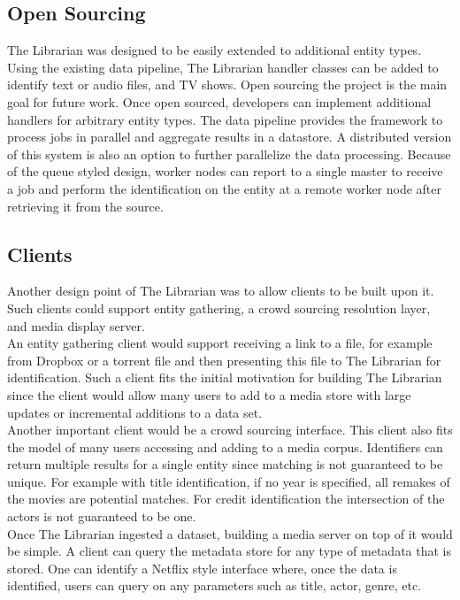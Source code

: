 \documentclass[paper=a4, fontsize=11pt]{scrartcl} %
\numberwithin{equation}{section} %
\numberwithin{figure}{section} %
\numberwithin{table}{section} %
\begin{document}
\subsection{Open Sourcing}
\label{sec:open-sourcing}
The Librarian was designed to be easily extended to additional entity types. Using the existing data pipeline, The Librarian handler classes can be added to identify text or audio files, and TV shows. Open sourcing the project is the main goal for future work. Once open sourced, developers can implement additional handlers for arbitrary entity types. The data pipeline provides the framework to process jobs in parallel and aggregate results in a datastore. A distributed version of this system is also an option to further parallelize the data processing. Because of the queue styled design, worker nodes can report to a single master to receive a job and perform the identification on the entity at a remote worker node after retrieving it from the source. \\

\subsection{Clients}
\label{sec:clients}
Another design point of The Librarian was to allow clients to be built upon it. Such clients could support entity gathering, a crowd sourcing resolution layer, and media display server. \\

An entity gathering client would support receiving a link to a file, for example from Dropbox or a torrent file and then presenting this file to The Librarian for identification. Such a client fits the initial motivation for building The Librarian since the client would allow many users to add to a media store with large updates or incremental additions to a data set. \\

Another important client would be a crowd sourcing interface. This client also fits the model of many users accessing and adding to a media corpus. Identifiers can return multiple results for a single entity since matching is not guaranteed to be unique. For example with title identification, if no year is specified, all remakes of the movies are potential matches. For credit identification the intersection of the actors is not guaranteed to be one. \\

Once The Librarian ingested a dataset, building a media server on top of it would be simple. A client can query the metadata store for any type of metadata that is stored. One can identify a Netflix style interface where, once the data is identified, users can query on any parameters such as title, actor, genre, etc. \\
\end{document}
